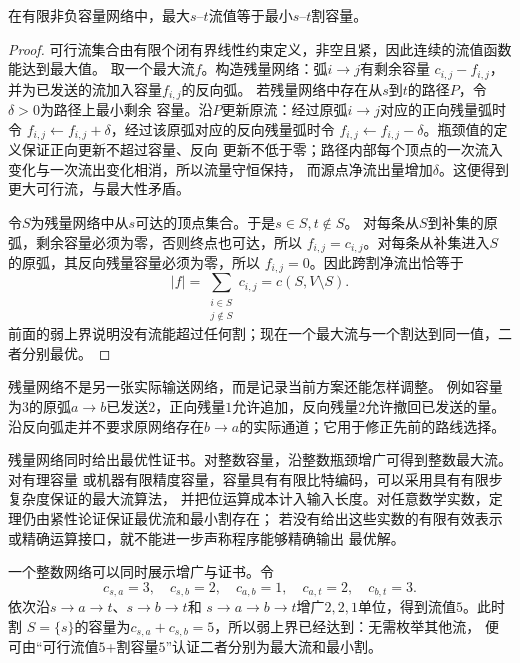 \begin{theorem}[最大流最小割定理]
  \label{thm:graph-theory-max-flow-min-cut}
  在有限非负容量网络中，最大\(s\)--\(t\)流值等于最小\(s\)--\(t\)割容量。
\end{theorem}

\begin{proof}
可行流集合由有限个闭有界线性约束定义，非空且紧，因此连续的流值函数能达到最大值。
取一个最大流\(f\)。构造残量网络：弧\(i\to j\)有剩余容量
\(c_{i,j}-f_{i,j}\)，并为已发送的流加入容量\(f_{i,j}\)的反向弧。
若残量网络中存在从\(s\)到\(t\)的路径\(P\)，令\(\delta>0\)为路径上最小剩余
容量。沿\(P\)更新原流：经过原弧\(i\to j\)对应的正向残量弧时令
\(f_{i,j}\leftarrow f_{i,j}+\delta\)，经过该原弧对应的反向残量弧时令
\(f_{i,j}\leftarrow f_{i,j}-\delta\)。瓶颈值的定义保证正向更新不超过容量、反向
更新不低于零；路径内部每个顶点的一次流入变化与一次流出变化相消，所以流量守恒保持，
而源点净流出量增加\(\delta\)。这便得到更大可行流，与最大性矛盾。

令\(S\)为残量网络中从\(s\)可达的顶点集合。于是\(s\in S,t\notin S\)。
对每条从\(S\)到补集的原弧，剩余容量必须为零，否则终点也可达，所以
\(f_{i,j}=c_{i,j}\)。对每条从补集进入\(S\)的原弧，其反向残量容量必须为零，所以
\(f_{i,j}=0\)。因此跨割净流出恰等于
\[
  |f|=\sum_{\substack{i\in S\\j\notin S}}c_{i,j}
  =c(S,V\setminus S).
\]
前面的弱上界说明没有流能超过任何割；现在一个最大流与一个割达到同一值，二者分别最优。
\end{proof}

残量网络不是另一张实际输送网络，而是记录当前方案还能怎样调整。
例如容量为\(3\)的原弧\(a\to b\)已发送\(2\)，正向残量\(1\)允许追加，反向残量\(2\)允许撤回已发送的量。
沿反向弧走并不要求原网络存在\(b\to a\)的实际通道；它用于修正先前的路线选择。

残量网络同时给出最优性证书。对整数容量，沿整数瓶颈增广可得到整数最大流。对有理容量
或机器有限精度容量，容量具有有限比特编码，可以采用具有有限步复杂度保证的最大流算法，
并把位运算成本计入输入长度。对任意数学实数，定理仍由紧性论证保证最优流和最小割存在；
若没有给出这些实数的有限有效表示或精确运算接口，就不能进一步声称程序能够精确输出
最优解。

一个整数网络可以同时展示增广与证书。令
\[
  c_{s,a}=3,\quad c_{s,b}=2,\quad c_{a,b}=1,\quad
  c_{a,t}=2,\quad c_{b,t}=3.
\]
依次沿\(s\to a\to t\)、\(s\to b\to t\)和
\(s\to a\to b\to t\)增广\(2,2,1\)单位，得到流值\(5\)。此时割
\(S=\{s\}\)的容量为\(c_{s,a}+c_{s,b}=5\)，所以弱上界已经达到：无需枚举其他流，
便可由“可行流值\(5\)+割容量\(5\)”认证二者分别为最大流和最小割。

